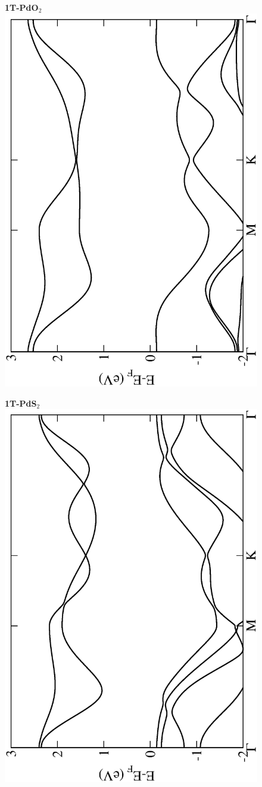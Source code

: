 \begin{figure}[htbp]
\centering
{\bfseries \sffamily 1T-PdO$_{2}$}\\
\includegraphics[width=0.45\linewidth, angle=-90, trim={2.9cm, 0cm, 2cm, 0cm}, clip]{img/SI_figs/BS/1T-PdO2.eps}
\end{figure}

\begin{figure}[htbp]
\centering
{\bfseries \sffamily 1T-PdS$_{2}$}\\
\includegraphics[width=0.45\linewidth, angle=-90, trim={2.9cm, 0cm, 2cm, 0cm}, clip]{img/SI_figs/BS/1T-PdS2.eps}
\end{figure}

